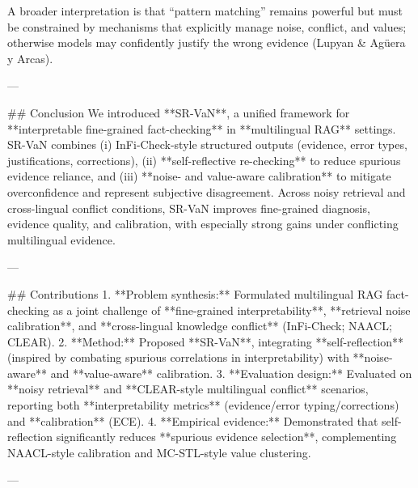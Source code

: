A broader interpretation is that “pattern matching” remains powerful but must be constrained by mechanisms that explicitly manage noise, conflict, and values; otherwise models may confidently justify the wrong evidence (Lupyan & Agüera y Arcas).

---

## Conclusion  
We introduced **SR-VaN**, a unified framework for **interpretable fine-grained fact-checking** in **multilingual RAG** settings. SR-VaN combines (i) InFi-Check-style structured outputs (evidence, error types, justifications, corrections), (ii) **self-reflective re-checking** to reduce spurious evidence reliance, and (iii) **noise- and value-aware calibration** to mitigate overconfidence and represent subjective disagreement. Across noisy retrieval and cross-lingual conflict conditions, SR-VaN improves fine-grained diagnosis, evidence quality, and calibration, with especially strong gains under conflicting multilingual evidence.

---

## Contributions  
1. **Problem synthesis:** Formulated multilingual RAG fact-checking as a joint challenge of **fine-grained interpretability**, **retrieval noise calibration**, and **cross-lingual knowledge conflict** (InFi-Check; NAACL; CLEAR).  
2. **Method:** Proposed **SR-VaN**, integrating **self-reflection** (inspired by combating spurious correlations in interpretability) with **noise-aware** and **value-aware** calibration.  
3. **Evaluation design:** Evaluated on **noisy retrieval** and **CLEAR-style multilingual conflict** scenarios, reporting both **interpretability metrics** (evidence/error typing/corrections) and **calibration** (ECE).  
4. **Empirical evidence:** Demonstrated that self-reflection significantly reduces **spurious evidence selection**, complementing NAACL-style calibration and MC-STL-style value clustering.

---